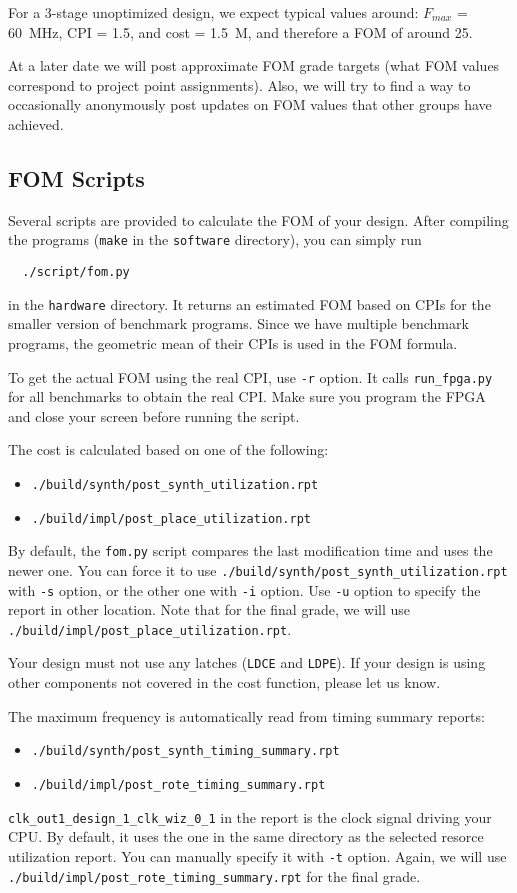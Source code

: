 For a 3-stage unoptimized design, we expect typical values around: $F_{max}$ = 60~MHz, CPI = 1.5, and cost = 1.5~M, and therefore a FOM of around 25.

At a later date we will post approximate FOM grade targets (what FOM values correspond to project point assignments).
Also, we will try to find a way to occasionally anonymously post updates on FOM values that other groups have achieved.


\subsection{FOM Scripts}
Several scripts are provided to calculate the FOM of your design.
After compiling the programs (\verb|make| in the \verb|software| directory),
you can simply run
\begin{verbatim}
  ./script/fom.py
\end{verbatim}
in the \verb|hardware| directory.
It returns an estimated FOM based on CPIs for the smaller version of benchmark programs.
Since we have multiple benchmark programs, the geometric mean of their CPIs is used in the FOM formula.

To get the actual FOM using the real CPI, use \verb|-r| option.
It calls \verb|run_fpga.py| for all benchmarks to obtain the real CPI.
Make sure you program the FPGA and close your screen before running the script.

The cost is calculated based on one of the following:
\begin{itemize}
\item \verb|./build/synth/post_synth_utilization.rpt|
\item \verb|./build/impl/post_place_utilization.rpt|
\end{itemize}
By default, the \verb|fom.py| script compares the last modification time and uses the newer one.
You can force it to use \verb|./build/synth/post_synth_utilization.rpt| with \verb|-s| option,
or the other one with \verb|-i| option.
Use \verb|-u| option to specify the report in other location.
Note that for the final grade, we will use \verb|./build/impl/post_place_utilization.rpt|.

Your design must not use any latches (\verb|LDCE| and \verb|LDPE|).
If your design is using other components not covered in the cost function, please let us know.

The maximum frequency is automatically read from timing summary reports:
\begin{itemize}
\item \verb|./build/synth/post_synth_timing_summary.rpt|
\item \verb|./build/impl/post_rote_timing_summary.rpt|
\end{itemize}
\verb|clk_out1_design_1_clk_wiz_0_1| in the report is the clock signal driving your CPU.
By default, it uses the one in the same directory as the selected resorce utilization report.
You can manually specify it with \verb|-t| option.
Again, we will use \verb|./build/impl/post_rote_timing_summary.rpt| for the final grade.

